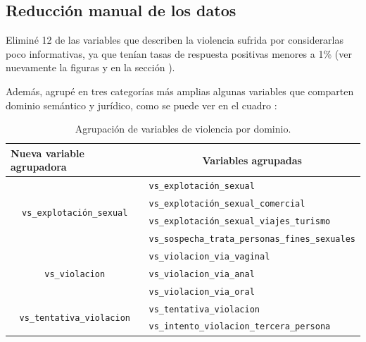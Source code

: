 \documentclass[10 pt]{article}
\begin{document}
\subsection{Reducción manual de los datos}\label{reduccionmanual}

Eliminé 12 de las variables que describen la violencia sufrida por considerarlas poco informativas, ya que tenían tasas de respuesta positivas menores a 1\% (ver nuevamente la figuras  y  en la sección ). 

Además, agrupé en tres categorías más amplias algunas variables que comparten dominio semántico y jurídico, como se puede ver en el cuadro :


\begin{table}[H]
    \centering
    \small
    \caption{Agrupación de variables de violencia por dominio.}
    \label{tablaagrup}
    \begin{tabular}{|c|l|}
    \hline
    \multicolumn{1}{|l|}{\textbf{Nueva variable agrupadora}} & \multicolumn{1}{c|}{\textbf{Variables agrupadas}} \\ \hline
    \multirow{4}{*}{\texttt{vs\_explotación\_sexual}}                 & \texttt{vs\_explotación\_sexual}                           \\ \cline{2-2} 
    & \texttt{vs\_explotación\_sexual\_comercial}                \\ \cline{2-2} 
    & \texttt{vs\_explotación\_sexual\_viajes\_turismo}          \\ \cline{2-2} 
    & \texttt{vs\_sospecha\_trata\_personas\_fines\_sexuales}    \\ \hline
\multirow{3}{*}{\texttt{vs\_violacion}}                          & \texttt{vs\_violacion\_via\_vaginal}                      \\ \cline{2-2} 
    & \texttt{vs\_violacion\_via\_anal}                         \\ \cline{2-2} 
    & \texttt{vs\_violacion\_via\_oral}                         \\ \hline
\multirow{2}{*}{\texttt{vs\_tentativa\_violacion}}                & \texttt{vs\_tentativa\_violacion}                     \\ \cline{2-2} 
    & \texttt{vs\_intento\_violacion\_tercera\_persona}           \\ \hline

    \end{tabular}
    \end{table}
\end{document}
